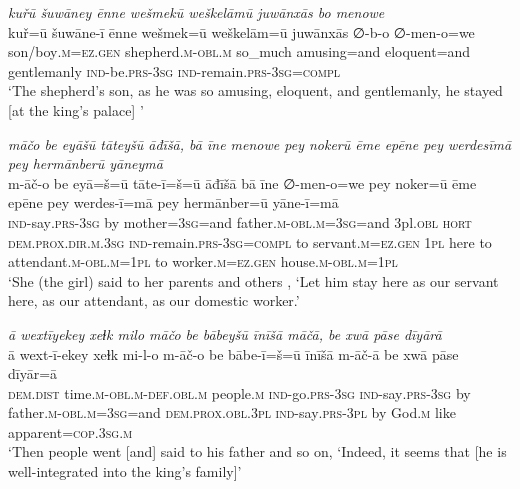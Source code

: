\ea \label{KŠ.42}
\textit{kuřū šuwāney ēnne wešmekū weškelāmū juwānxās bo menowe} \\ 
\gll kuř=ū šuwāne-ī ēnne wešmek=ū weškelām=ū juwānxās ∅-b-o ∅-men-o=we \\ 
 son/boy\textsc{.m}\textsc{=ez.gen} shepherd\textsc{.m}\textsc{-obl}\textsc{.m} so\_much amusing=and eloquent=and gentlemanly \textsc{ind-}be\textsc{.prs}\textsc{-3sg} \textsc{ind-}remain\textsc{.prs}\textsc{-3sg}\textsc{=compl} \\ 
\glt `The shepherd’s son, as he was so amusing, eloquent, and gentlemanly, he stayed [at the king’s palace] '
\z 
 
\ea \label{KŠ.43}
\textit{māčo be eyāšū tāteyšū āđīšā, bā īne menowe pey nokerū ēme epēne pey werdesīmā pey hermānberū yāneymā} \\ 
\gll m-āč-o be eyā=š=ū tāte-ī=š=ū āđīšā bā īne ∅-men-o=we pey noker=ū ēme epēne pey werdes-ī=mā pey hermānber=ū yāne-ī=mā \\ 
 \textsc{ind-}say\textsc{.prs}\textsc{-3sg} by mother\textsc{=3sg}=and father\textsc{.m}\textsc{-obl}\textsc{.m}\textsc{=3sg}=and 3pl\textsc{.obl} \textsc{hort} \textsc{dem.prox}\textsc{.dir}\textsc{.m}\textsc{.3sg} \textsc{ind-}remain\textsc{.prs}\textsc{-3sg}\textsc{=compl} to servant\textsc{.m}\textsc{=ez.gen} \textsc{1pl} here to attendant\textsc{.m}\textsc{-obl}\textsc{.m}\textsc{=\textsc{1pl}} to worker\textsc{.m}\textsc{=ez.gen} house\textsc{.m}\textsc{-obl}\textsc{.m}\textsc{=\textsc{1pl}} \\ 
\glt `She (the girl) said to her parents and others , ‘Let him stay here as our servant here, as our attendant, as our domestic worker.'
\z 
 
\ea \label{KŠ.46}
\textit{ā wextīyekey xeɫk milo māčo be bābeyšū īnīšā māčā, be xwā pāse dīyārā} \\ 
\gll ā wext-ī-ekey xeɫk mi-l-o m-āč-o be bābe-ī=š=ū īnīšā m-āč-ā be xwā pāse dīyār=ā \\ 
 \textsc{dem.dist} time\textsc{.m}\textsc{-obl}\textsc{.m}\textsc{-def}\textsc{.obl}\textsc{.m} people\textsc{.m} \textsc{ind-}go\textsc{.prs}\textsc{-3sg} \textsc{ind-}say\textsc{.prs}\textsc{-3sg} by father\textsc{.m}\textsc{-obl}\textsc{.m}\textsc{=3sg}=and \textsc{dem.prox}\textsc{.obl}\textsc{.3pl} \textsc{ind-}say\textsc{.prs}\textsc{-3pl} by God\textsc{.m} like apparent\textsc{=cop}\textsc{.3sg}\textsc{.m} \\ 
\glt `Then people went [and] said to his father and so on, ‘Indeed, it seems that [he is well-integrated into the king’s family]'
\z 
 
